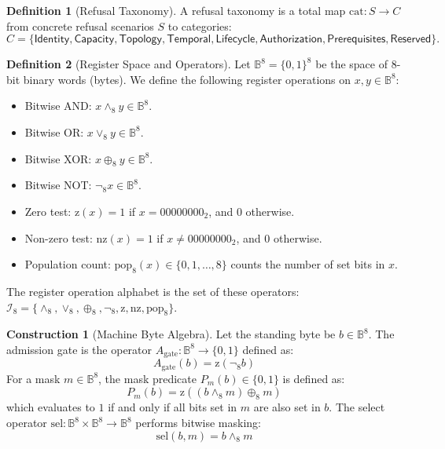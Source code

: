 \documentclass[11pt,oneside]{book}
\theoremstyle{definition}
\newtheorem{definition}{Definition}[chapter]
\newtheorem{construction}{Construction}[chapter]
\theoremstyle{plain}
\theoremstyle{remark}
\begin{document}
\begin{definition}[Refusal Taxonomy]\label{def:taxonomy_def}
A refusal taxonomy is a total map $\mathrm{cat}: S \to C$ from concrete refusal scenarios $S$ to categories:
\[
C = \{\textsf{Identity}, \textsf{Capacity}, \textsf{Topology}, \textsf{Temporal},
     \textsf{Lifecycle}, \textsf{Authorization}, \textsf{Prerequisites}, \textsf{Reserved}\}.
\] %
\end{definition}

\begin{definition}[Register Space and Operators]\label{def:register_ops}
Let $\mathbb{B}^8 = \{0, 1\}^8$ be the space of 8-bit binary words (bytes). %
We define the following register operations on $x, y \in \mathbb{B}^8$: %
\begin{itemize}
  \item Bitwise AND: $x \wedge_8 y \in \mathbb{B}^8$. %
  \item Bitwise OR: $x \lor_8 y \in \mathbb{B}^8$. %
  \item Bitwise XOR: $x \oplus_8 y \in \mathbb{B}^8$. %
  \item Bitwise NOT: $\neg_8 x \in \mathbb{B}^8$. %
  \item Zero test: $\text{z}(x) = 1$ if $x = 00000000_2$, and $0$ otherwise. %
  \item Non-zero test: $\text{nz}(x) = 1$ if $x \neq 00000000_2$, and $0$ otherwise. %
  \item Population count: $\text{pop}_8(x) \in \{0, 1, \dots, 8\}$ counts the number of set bits in $x$. %
\end{itemize}
The register operation alphabet is the set of these operators: $\mathcal{I}_8 = \{ \wedge_8, \lor_8, \oplus_8, \neg_8, \text{z}, \text{nz}, \text{pop}_8 \}$. %
\end{definition}

\begin{construction}[Machine Byte Algebra]\label{con:byte_algebra}
Let the standing byte be $b \in \mathbb{B}^8$. %
The admission gate is the operator $A_{\text{gate}}: \mathbb{B}^8 \to \{0,1\}$ defined as:
\[
A_{\text{gate}}(b) = \text{z}(\neg_8 b)
\] %
For a mask $m \in \mathbb{B}^8$, the mask predicate $P_m(b) \in \{0, 1\}$ is defined as:
\[
P_m(b) = \text{z}((b \wedge_8 m) \oplus_8 m)
\]
which evaluates to $1$ if and only if all bits set in $m$ are also set in $b$. %
The select operator $\text{sel}: \mathbb{B}^8 \times \mathbb{B}^8 \to \mathbb{B}^8$ performs bitwise masking:
\[
\text{sel}(b, m) = b \wedge_8 m
\] %
\end{construction}
\end{document}
